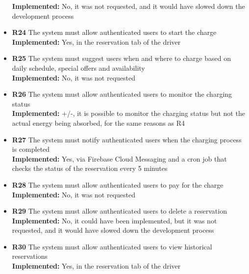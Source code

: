 \begin{itemize}
          \textbf{Implemented:} No, it was not requested, and it would have slowed down the development process
    \item        \textbf{R24} The system must allow authenticated users to start the charge                                                     \\
          \textbf{Implemented:} Yes, in the reservation tab of the driver
    \item        \textbf{R25} The system must suggest users when and where to charge based on daily schedule, special offers and availability   \\
          \textbf{Implemented:} No, it was not requested
    \item        \textbf{R26} The system must allow authenticated users to monitor the charging status                                          \\
          \textbf{Implemented:} +/-, it is possible to monitor the charging status but not the actual energy being absorbed, for the same reasons as R4
    \item        \textbf{R27} The system must notify authenticated users when the charging process is completed                                 \\
          \textbf{Implemented:} Yes, via Firebase Cloud Messaging and a cron job that checks the status of the reservation every 5 minutes
    \item        \textbf{R28} The system must allow authenticated users to pay for the charge                                                   \\
          \textbf{Implemented:} No, it was not requested
    \item        \textbf{R29} The system must allow authenticated users to delete a reservation                                                 \\
          \textbf{Implemented:} No, it could have been implemented, but it was not requested, and it would have slowed down the development process
    \item        \textbf{R30} The system must allow authenticated users to view historical reservations                                         \\
          \textbf{Implemented:} Yes, in the reservation tab of the driver
\end{itemize}